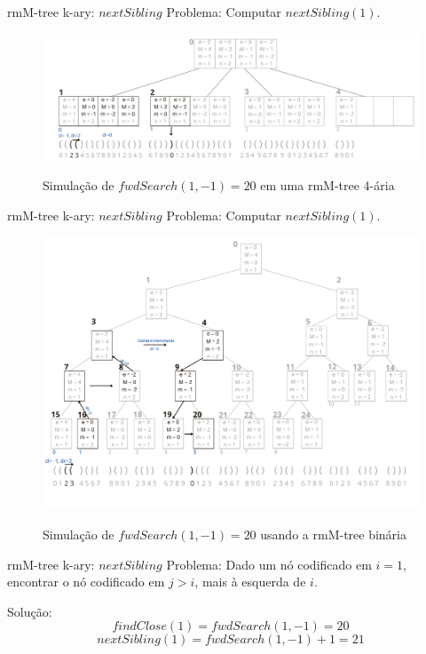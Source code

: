  \begin{frame}{rmM-tree k-ary: $nextSibling$}
    Problema: Computar $nextSibling(1)$.
     \begin{figure}[h!]
         \centering
         \includegraphics[scale=0.8]{images/rmm-tree-kary-fwd.png}\\
         \caption{Simulação de $fwdSearch(1,-1)=20$ em uma rmM-tree 4-ária}
     \end{figure} 
 \end{frame}

 \begin{frame}{rmM-tree k-ary: $nextSibling$}
    Problema: Computar $nextSibling(1)$.
     \begin{figure}[h!]
         \centering
         \includegraphics[scale=0.27]{images/rmm-tree-bin-fwdSearch.png}\\
         \caption{Simulação de $fwdSearch(1,-1)=20$ usando a rmM-tree binária}
     \end{figure} 
 \end{frame}


 \begin{frame}{rmM-tree k-ary: $nextSibling$}
    Problema: Dado um nó codificado em $i=1$, encontrar o nó codificado em $j>i$, mais à esquerda de $i$.

    Solução: 
    $$findClose(1) = fwdSearch(1,-1) = 20 $$ 
    $$nextSibling(1) = fwdSearch(1,-1) + 1 = 21 $$ 
 \end{frame}

